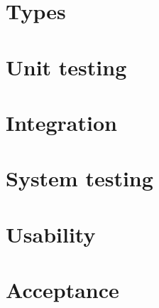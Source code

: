 \section{Types}
\section{Unit testing}
\section{Integration}
\section{System testing}
\section{Usability}
\section{Acceptance}





